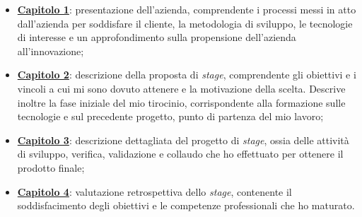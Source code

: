 \begin{itemize}
  \item \hyperref[cap:contesto-aziendale]{\textbf{Capitolo 1}}: presentazione dell'azienda, comprendente i processi messi in atto dall'azienda per soddisfare il cliente, la metodologia di sviluppo, le tecnologie di interesse e un approfondimento sulla propensione dell'azienda all'innovazione;
  \item \hyperref[cap:progetto-contesto-aziendale]{\textbf{Capitolo 2}}: descrizione della proposta di \textit{stage}, comprendente gli obiettivi e i vincoli a cui mi sono dovuto attenere e la motivazione della scelta. Descrive inoltre la fase iniziale del mio tirocinio, corrispondente alla formazione sulle tecnologie e sul precedente progetto, punto di partenza del mio lavoro;
  \item \hyperref[cap:progetto-stage]{\textbf{Capitolo 3}}: descrizione dettagliata del progetto di \textit{stage}, ossia delle attività di sviluppo, verifica, validazione e collaudo che ho effettuato per ottenere il prodotto finale;
  \item \hyperref[cap:valutazioni-retrospettive]{\textbf{Capitolo 4}}: valutazione retrospettiva dello \textit{stage}, contenente il soddisfacimento degli obiettivi e le competenze professionali che ho maturato.
\end{itemize}




%
%

\endgroup

\vfill
